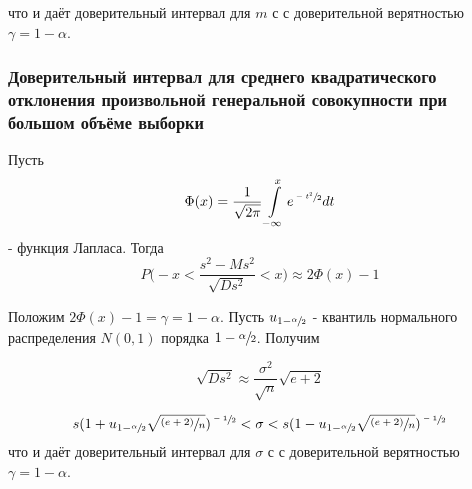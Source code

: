 \noindent что и даёт доверительный интервал для $m$ с с доверительной верятностью $\gamma = 1 - \alpha$. 


\subsubsection{Доверительный интервал для среднего квадратического отклонения произвольной генеральной совокупности при большом объёме выборки}

Пусть 
\begin{equation*}
    \Phi(x) = \dfrac{1}{\sqrt{2\pi}} \int \limits_{-\infty}
 ^{x}e^{\sfrac{-t^2}{2}}dt
 \end{equation*}
\noindent - функция Лапласа. Тогда 
$$P\Bigg(-x < \dfrac{s^2 - Ms^2}{\sqrt{Ds^2}} < x\Bigg) \approx 2\Phi(x) - 1$$

\noindent Положим $2\Phi(x) - 1 = \gamma = 1 -\alpha$. Пусть $u_{1 - \sfrac{\alpha}{2}}$ - квантиль нормального распределения $N(0, 1)$ порядка $1 - \sfrac{\alpha}{2}$. Получим

$$\sqrt{Ds^2} \approx \dfrac{\sigma^2}{\sqrt{n}}\sqrt{e + 2} $$

\begin{equation}
    s(1 + u_{1 - \sfrac{\alpha}{2}}\sqrt{\sfrac{(e+2)}{n}})^{\sfrac{-1}{2}} < \sigma < s(1 - u_{1 - \sfrac{\alpha}{2}}\sqrt{\sfrac{(e+2)}{n}})^{\sfrac{-1}{2}}
    \label{eq19}
\end{equation}
\noindent что и даёт доверительный интервал для $\sigma$ с с доверительной верятностью $\gamma = 1 - \alpha$. 
